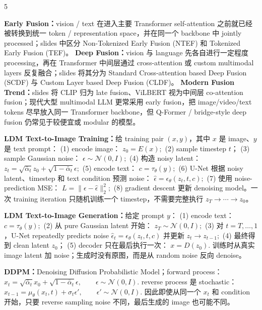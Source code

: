 \documentclass[a4paper, landscape]{article}
\begin{document}
\begin{multicols}{5}
\par \textbf{Early Fusion：}vision / text 在进入主要 Transformer self-attention 之前就已经被转换到统一 token / representation space，并在同一个 backbone 中 jointly processed；slides 中区分 Non-Tokenized Early Fusion (NTEF) 和 Tokenized Early Fusion (TEF)。
\textbf{Deep Fusion：}vision 与 language 先各自进行一定程度 processing，再在 Transformer 中间层通过 cross-attention 或 custom multimodal layers 反复融合；slides 将其分为 Standard Cross-attention based Deep Fusion (SCDF) 与 Custom Layer based Deep Fusion (CLDF)。
\textbf{Modern Fusion Trend：}slides 将 CLIP 归为 late fusion、ViLBERT 视为中间层 co-attention fusion；现代大型 multimodal LLM 更常采用 early fusion，把 image/video/text tokens 尽早放入同一 Transformer backbone，但 Q-Former / bridge-style deep fusion 仍常见于较便宜或 modular 的模型。

\par \textbf{LDM Text-to-Image Training：}给 training pair \((x,y)\)，其中 \(x\) 是 image、\(y\) 是 text prompt：
(1) encode image：
\(
z_0=E(x);
\)
(2) sample timestep \(t\)；
(3) sample Gaussian noise：
\(
\epsilon\sim\mathcal N(0,I);
\)
(4) 构造 noisy latent：
\(
z_t=\sqrt{\bar\alpha_t}z_0+
\sqrt{1-\bar\alpha_t}\epsilon;
\)
(5) encode text：
\(
c=\tau_\theta(y);
\)
(6) U-Net 根据 noisy latent、timestep 和 text condition 预测 noise：
\(
\hat\epsilon=\epsilon_\theta(z_t,t,c);
\)
(7) 使用 noise-prediction MSE：
\(
L=
\|\epsilon-\hat\epsilon\|_2^2;
\)
(8) gradient descent 更新 denoising model。一次 training iteration 只随机训练一个 timestep，不需要完整执行 \(z_T\rightarrow\cdots\rightarrow z_0\)。

\par \textbf{LDM Text-to-Image Generation：}给定 prompt \(y\)：
(1) encode text：
\(
c=\tau_\theta(y);
\)
(2) 从 pure Gaussian latent 开始：
\(
z_T\sim\mathcal N(0,I);
\)
(3) 对 \(t=T,\ldots,1\)，U-Net repeatedly predicts noise
\(
\hat\epsilon_t=\epsilon_\theta(z_t,t,c)
\)
并更新
\(
z_t\rightarrow z_{t-1};
\)
(4) 最终得到 clean latent \(z_0\)；
(5) decoder 只在最后执行一次：
\(
x=D(z_0).
\)
训练时从真实 image latent 加 noise；生成时没有原图，而是从 random noise 反向 denoise。

\par \textbf{DDPM：}Denoising Diffusion Probabilistic Model；forward process：
\(
x_t=
\sqrt{\bar\alpha_t}x_0+
\sqrt{1-\bar\alpha_t}\epsilon,
\qquad
\epsilon\sim\mathcal N(0,I).
\)
reverse process 是 stochastic：
\(
x_{t-1}
=
\mu_\theta(x_t,t)
+
\sigma_t\epsilon',
\qquad
\epsilon'\sim\mathcal N(0,I).
\)
因此即使从同一个 \(x_t\) 和 condition 开始，只要 reverse sampling noise 不同，最后生成的 image 也可能不同。


\end{multicols}
\end{document}

